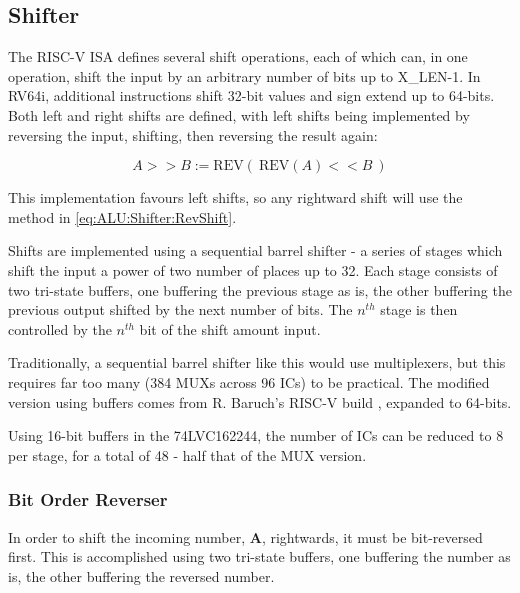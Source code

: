 \documentclass[a4paper, 11pt]{article}
\begin{document}
        \subsection{Shifter}\label{sec:ALU:Shifter}

            The RISC-V ISA defines several shift operations, each of which can, in one
            operation, shift the input by an arbitrary number of bits up to X\_LEN-1.
            In RV64i, additional instructions shift 32-bit values and sign extend
            up to 64-bits. Both left and right shifts are defined, with left shifts
            being implemented by reversing the input, shifting, then reversing the
            result again:

                \begin{equation}\label{eq:ALU:Shifter:RevShift}
                    A >> B := \text{REV}(\ \text{REV}(A) << B \ )
                \end{equation}

            This implementation favours left shifts, so any rightward shift will use
            the method in \cref{eq:ALU:Shifter:RevShift}.

            Shifts are implemented using a sequential barrel shifter - a series
            of stages which shift the input a power of two number of places
            up to 32. Each stage consists of two tri-state buffers, one buffering
            the previous stage as is, the other buffering the previous output shifted
            by the next number of bits. The \(n^{th}\) stage is then controlled by
            the \(n^{th}\) bit of the shift amount input.

            Traditionally, a sequential barrel shifter like this would use multiplexers,
            but this requires far too many (384 MUXs across 96 ICs) to be practical.
            The modified version using buffers comes from R. Baruch's RISC-V build
            \cite{RobB_Shifter}, expanded to 64-bits.

            Using 16-bit buffers in the 74LVC162244, the number of ICs can be reduced to
            8 per stage, for a total of 48 - half that of the MUX version.

            \subsubsection{Bit Order Reverser}\label{sec:ALU:Shifter:BitRev}

                In order to shift the incoming number, \textbf{A}, rightwards, it must
                be bit-reversed first. This is accomplished using two tri-state
                buffers, one buffering the number as is, the other buffering the
                reversed number.
\end{document}
